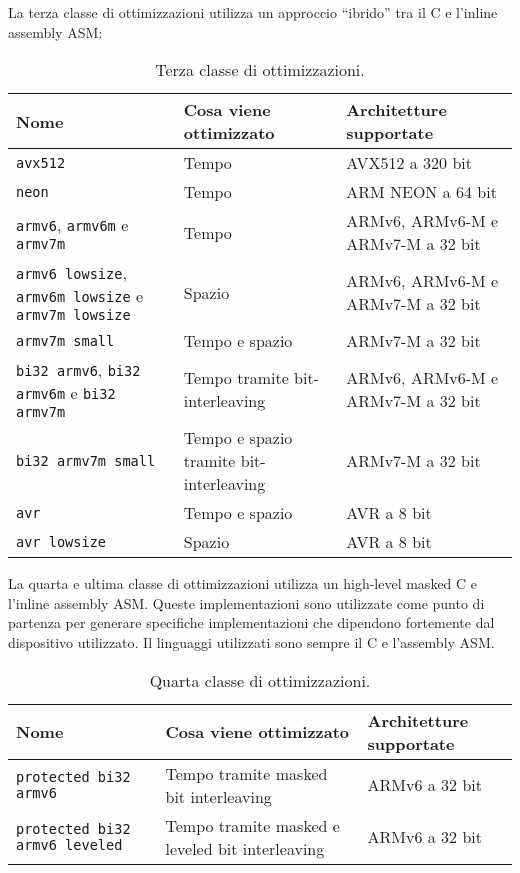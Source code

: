 \newpage

\noindent La terza classe di ottimizzazioni utilizza un approccio ``ibrido'' tra il C e l'inline assembly ASM\cite{github}:
\begin{table}[H]
    \centering
	\begin{tabular}{|m{}<{\centering}||m{}<{\centering}|m{}<{\centering}|}
		\hline
		\textbf{Nome} & \textbf{Cosa viene ottimizzato} & \textbf{Architetture supportate} \\
        \hline \hline
        \texttt{avx512} & Tempo & AVX512 a 320 bit \\
        \hline
        \texttt{neon} & Tempo & ARM NEON a 64 bit \\
        \hline
        \texttt{armv6}, \texttt{armv6m} e \texttt{armv7m} & Tempo & ARMv6, ARMv6-M e ARMv7-M a 32 bit \\
        \hline
        \texttt{armv6 lowsize}, \texttt{armv6m lowsize} e \texttt{armv7m lowsize} & Spazio & ARMv6, ARMv6-M e ARMv7-M a 32 bit \\
        \hline
        \texttt{armv7m small} & Tempo e spazio & ARMv7-M a 32 bit \\
        \hline
        \texttt{bi32 armv6}, \texttt{bi32 armv6m} e \texttt{bi32 armv7m} & Tempo tramite bit-interleaving & ARMv6, ARMv6-M e ARMv7-M a 32 bit \\
        \hline
        \texttt{bi32 armv7m small} & Tempo e spazio tramite bit-interleaving & ARMv7-M a 32 bit \\
        \hline
        \texttt{avr} & Tempo e spazio & AVR a 8 bit \\
        \hline
        \texttt{avr lowsize} & Spazio & AVR a 8 bit \\
        \hline
    \end{tabular}
    \caption{Terza classe di ottimizzazioni.}
\end{table}

\noindent La quarta e ultima classe di ottimizzazioni utilizza un high-level masked C e l'inline assembly ASM\cite{github}. Queste implementazioni sono utilizzate come punto di partenza per generare specifiche implementazioni che dipendono fortemente dal dispositivo utilizzato. Il linguaggi utilizzati sono sempre il C e l'assembly ASM.

\begin{table}[H]
    \centering
	\begin{tabular}{|m{}<{\centering}||m{}<{\centering}|m{}<{\centering}|}
		\hline
		\textbf{Nome} & \textbf{Cosa viene ottimizzato} & \textbf{Architetture supportate} \\
        \hline \hline
        \texttt{protected bi32 armv6} & Tempo tramite masked bit interleaving & ARMv6 a 32 bit \\
        \hline
        \texttt{protected bi32 armv6 leveled} & Tempo tramite masked e leveled bit interleaving & ARMv6 a 32 bit \\
        \hline
    \end{tabular}
    \caption{Quarta classe di ottimizzazioni.}
\end{table}
